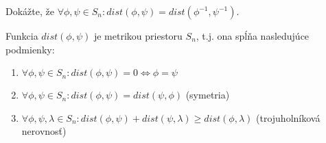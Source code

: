 \begin{toreview}
\begin{exercise}
Dokážte, že $\forall \phi, \psi \in S_n: dist(\phi, \psi) = dist(\phi^{-1}, \psi^{-1})$.
\end{exercise}
\end{toreview}


\begin{theorem}
    Funkcia $dist(\phi, \psi)$ je metrikou priestoru $S_n$, t.j. ona spĺňa nasledujúce podmienky:
    \begin{enumerate}
        \item $ \forall \phi, \psi \in S_n: dist(\phi, \psi) = 0 \Leftrightarrow \phi = \psi$
        \item $ \forall \phi, \psi \in S_n: dist(\phi, \psi) = dist(\psi, \phi)$ (symetria)
        \item $ \forall \phi, \psi, \lambda \in S_n: dist(\phi, \psi) + dist(\psi, \lambda) \geq dist(\phi, \lambda)$ (trojuholníková nerovnosť)  
    \end{enumerate}
\end{theorem}

